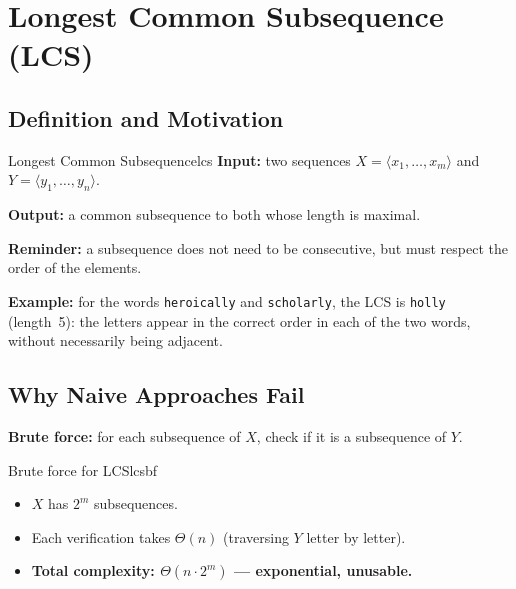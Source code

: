 
\section*{Longest Common Subsequence (LCS)}

\subsection{Definition and Motivation}

\begin{definition}{Longest Common Subsequence}{lcs}
\textbf{Input:} two sequences $X = \langle x_1, \ldots, x_m \rangle$ and
$Y = \langle y_1, \ldots, y_n \rangle$.

\textbf{Output:} a common subsequence to both whose length is maximal.

\textbf{Reminder:} a subsequence does not need to be consecutive, but must
respect the order of the elements.
\end{definition}

\textbf{Example:} for the words \texttt{heroically} and \texttt{scholarly}, the LCS
is \texttt{holly} (length~5): the letters appear in the correct order in
each of the two words, without necessarily being adjacent.

\subsection{Why Naive Approaches Fail}

\textbf{Brute force:} for each subsequence of $X$, check if it is
a subsequence of $Y$.

\begin{complexity}{Brute force for LCS}{lcsbf}
\begin{itemize}[noitemsep]
  \item $X$ has $2^m$ subsequences.
  \item Each verification takes $\Theta(n)$ (traversing $Y$ letter by letter).
  \item \textbf{Total complexity: $\Theta(n \cdot 2^m)$ — exponential, unusable.}
\end{itemize}
\end{complexity}

